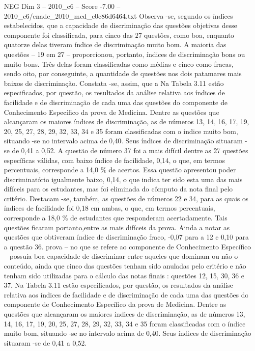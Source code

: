 \begin{textsample}{NEG Dim 3 – 2010\_c6 – Score -7.00 – 2010\_c6/enade\_2010\_med\_c0c86d6464.txt}
Observa -se, segundo os índices estabelecidos, que a capacidade de discriminação das questões objetivas desse componente foi classificada, para cinco das 27 questões, como boa, enquanto quatorze delas tiveram índice de discriminação muito bom.
A maioria das questões – 19 em 27 – proporcionou, portanto, índices de discriminação bons ou muito bons.
Três delas foram classificadas como médias e cinco como fracas, sendo oito, por conseguinte, a quantidade de questões nos dois patamares mais baixos de discriminação.
Constata -se, assim, que a Na Tabela 3.11 estão especificados, por questão, os resultados da análise relativa aos índices de facilidade e de discriminação de cada uma das questões do componente de Conhecimento Específico da prova de Medicina.
Dentre as questões que alcançaram os maiores índices de discriminação, as de números 13, 14, 16, 17, 19, 20, 25, 27, 28, 29, 32, 33, 34 e 35 foram classificadas com o índice muito bom, situando -se no intervalo acima de 0,40.
Seus índices de discriminação situaram -se de 0,41 a 0,52.
A questão de número 37 foi a mais difícil dentre as 27 questões específicas válidas, com baixo índice de facilidade, 0,14, o que, em termos percentuais, corresponde a 14,0 \% de acertos.
Essa questão apresentou poder discriminatório igualmente baixo, 0,14, o que indica ter sido esta uma das mais difíceis para os estudantes, mas foi eliminada do cômputo da nota final pelo critério.
Destacam -se, também, as questões de números 22 e 34, para as quais os índices de facilidade foi 0,18 em ambas, o que, em termos percentuais, corresponde a 18,0 \% de estudantes que responderam acertadamente.
Tais questões ficaram portanto,entre as mais difíceis da prova.
Ainda a notar as questões que obtiveram índice de discriminação fraco, -0,07 para a 12 e 0,10 para a questão 36. prova – no que se refere ao componente de Conhecimento Específico – possuía boa capacidade de discriminar entre aqueles que dominam ou não o conteúdo, ainda que cinco das questões tenham sido anuladas pelo critério e não tenham sido utilizadas para o cálculo das notas finais : questões 12, 15, 30, 36 e 37.
Na Tabela 3.11 estão especificados, por questão, os resultados da análise relativa aos índices de facilidade e de discriminação de cada uma das questões do componente de Conhecimento Específico da prova de Medicina.
Dentre as questões que alcançaram os maiores índices de discriminação, as de números 13, 14, 16, 17, 19, 20, 25, 27, 28, 29, 32, 33, 34 e 35 foram classificadas com o índice muito bom, situando -se no intervalo acima de 0,40.
Seus índices de discriminação situaram -se de 0,41 a 0,52.

\end{textsample}
